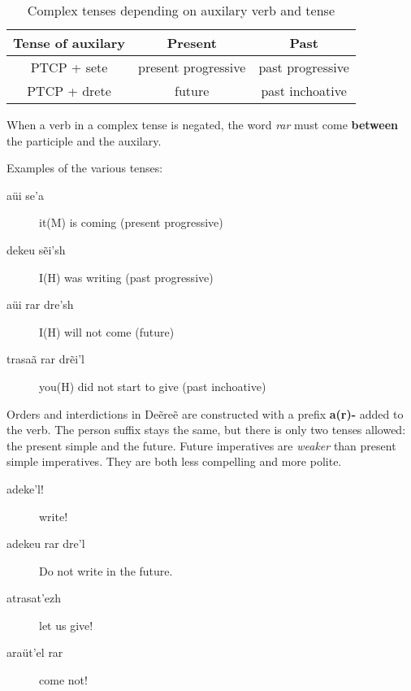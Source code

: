 \begin{table}[h]
\begin{center}
\begin{tabular}{|c|c|c|}\hline

\textbf{Tense of auxilary} & \textbf{Present} & \textbf{Past} \\\hline
PTCP + sete & present progressive & past progressive \\\hline
PTCP + drete & future & past inchoative \\\hline

\end{tabular}
\end{center}
\caption{Complex tenses depending on auxilary verb and tense}
\label{tab:conj-complex-tenses}
\end{table}

When a verb in a complex tense is negated, the word \emph{rar} must come \textbf{between} the participle and the auxilary.

Examples of the various tenses:
\begin{description}
\item[aüi se’a] it(M) is coming (present progressive)
\item[dekeu sẽi’sh] I(H) was writing (past progressive)
\item[aüi rar dre’sh] I(H) will not come (future)
\item[trasaã rar drẽi’l] you(H) did not start to give (past inchoative)
\end{description}

Orders and interdictions in Deẽreẽ are constructed with a prefix \textbf{a(r)-} added to the verb.
The person suffix stays the same, but there is only two tenses allowed: the present simple and the future.
Future imperatives are \emph{weaker} than present simple imperatives. They are both less compelling and more polite.

\begin{description}
\item[adeke’l!] write!
\item[adekeu rar dre’l] Do not write in the future.
\item[atrasat’ezh] let us give!
\item[araüt’el rar] come not!
\end{description}

